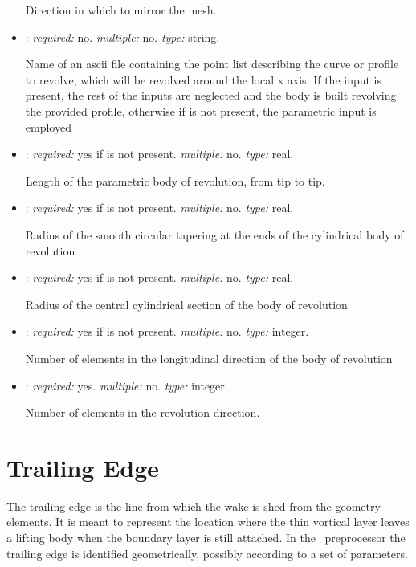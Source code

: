 \begin{itemize}
Direction in which to mirror the mesh.

\item {}: \textit{required:} no. \textit{multiple:} no. \textit{type:} string.

Name of an ascii file containing the point list describing the curve or profile to revolve, which will be revolved around the local x axis. If the input is present, the rest of the inputs are neglected and the body is built revolving the provided profile, otherwise if   is not present, the parametric input is employed

\item {}: \textit{required:} yes if  is not present. \textit{multiple:} no. \textit{type:} real.

Length of the parametric body of revolution, from tip to tip.

\item {}: \textit{required:} yes if  is not present. \textit{multiple:} no. \textit{type:} real.

Radius of the smooth circular tapering at the ends of the cylindrical body of revolution

\item {}: \textit{required:} yes if  is not present. \textit{multiple:} no. \textit{type:} real.

Radius of the central cylindrical section of the body of revolution

\item {}: \textit{required:} yes if  is not present. \textit{multiple:} no. \textit{type:} integer.

Number of elements in the longitudinal direction of the body of revolution


\item {}: \textit{required:} yes. \textit{multiple:} no. \textit{type:} integer.

Number of elements in the revolution direction. 


\end{itemize}


\section{Trailing Edge}
\label{sec:TrailingEdge}

The trailing edge is the line from which the wake is shed from the geometry elements. It is meant to represent the location where the thin vortical layer leaves a lifting body when the boundary layer is still attached. In the \DUST \ preprocessor the trailing edge is identified geometrically, possibly according to a set of parameters. 

